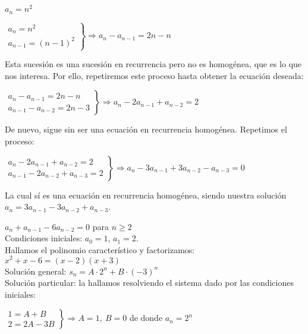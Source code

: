 \begin{ejemplo}
    $a_n = n^2$ \\
    \begin{center}
        $\left.
            \begin{aligned}
                a_n = n^2 \\
                a_{n-1} = (n-1)^2
            \end{aligned} \right \}
            \Rightarrow a_n - a_{n-1} = 2n -n$
    \end{center}
    Esta sucesión es una sucesión en recurrencia pero no es homogénea, que es lo que nos interesa. Por ello, repetiremos este proceso hasta obtener la ecuación deseada:
    \begin{center}
        $\left.
            \begin{aligned}
                a_n - a_{n-1} = 2n -n \\
                a_{n-1} - a_{n-2} = 2n -3
            \end{aligned} \right \}
            \Rightarrow a_n -2a_{n-1} +a_{n-2} = 2$
    \end{center}
    De nuevo, sigue sin ser una ecuación en recurrencia homogénea. Repetimos el proceso:
    \begin{center}
        $\left.
            \begin{aligned}
                a_n -2a_{n-1} +a_{n-2} = 2 \\
                a_{n-1} -2a_{n-2} +a_{n-3} = 2
            \end{aligned} \right \}
            \Rightarrow a_n -3a_{n-1} +3a_{n-2} -a_{n-3} = 0$
    \end{center}
    La cual sí es una ecuación en recurrencia homogénea, siendo nuestra solución $a_n = 3a_{n-1} -3a_{n-2} +a_{n-3}$.
\end{ejemplo}

\begin{ejemplo} $a_{n} + a_{n-1} -6a_{n-2} = 0$ para $n \geq 2$ \\
    Condiciones iniciales: $a_{0} = 1$, $a_{1} = 2$.\\
    Hallamos el polinomio característico y factorizamos: $x^2 + x -6 = (x-2)(x+3)$\\
    Solución general: $s_{n} = A \cdot 2^{n} + B \cdot (-3)^{n}$ \\
    Solución particular: la hallamos resolviendo el sistema dado por las condiciones iniciales:
    \begin{center}
        $\left.
            \begin{aligned}
                1 = A + B \\
                2 = 2A - 3B
            \end{aligned} \right \}
            \Rightarrow A = 1, \ B = 0 \text{ de donde } a_n = 2^n$
    \end{center}
\end{ejemplo}
\smallskip

